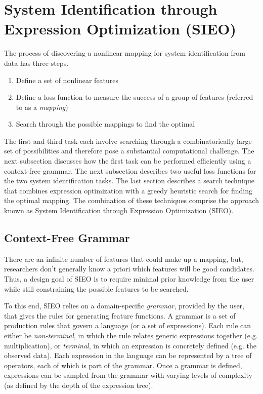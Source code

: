 \documentclass{article}
\begin{document}
\section{System Identification through Expression Optimization (SIEO)}
\label{sieo}
The process of discovering a nonlinear mapping for system identification from data has three steps.
\begin{enumerate}
    \item Define a set of nonlinear features
    \item Define a loss function to measure the success of a group of features (referred to as a \textit{mapping})
    \item Search through the possible mappings to find the optimal
\end{enumerate}
The first and third task each involve searching through a combinatorically large set of possibilities and therefore pose a substantial computational challenge. The next subsection discusses how the first task can be performed efficiently using a context-free grammar. The next subsection describes two useful loss functions for the two system identification tasks. The last section describes a search technique that combines expression optimization with a greedy heuristic search for finding the optimal mapping. The combination of these techniques comprise the  approach known as System Identification through Expression Optimization (SIEO).

\subsection{Context-Free Grammar}

There are an infinite number of features that could make up a mapping, but, researchers don't generally know a priori which features will be good candidates. Thus, a design goal of SIEO is to require minimal prior knowledge from the user while still constraining the possible features to be searched.

To this end, SIEO relies on a domain-specific \textit{grammar}, provided by the user, that gives the rules for generating feature functions. A grammar is a set of production rules that govern a language (or a set of expressions). Each rule can either be \textit{non-terminal}, in which the rule relates generic expressions together (e.g. multiplication), or \textit{terminal}, in which an expression is concretely defined (e.g. the observed data). Each expression in the language can be represented by a tree of operators, each of which is part of the grammar. Once a grammar is defined, expressions can be sampled from the grammar with varying levels of complexity (as defined by the depth of the expression tree).
\end{document}
